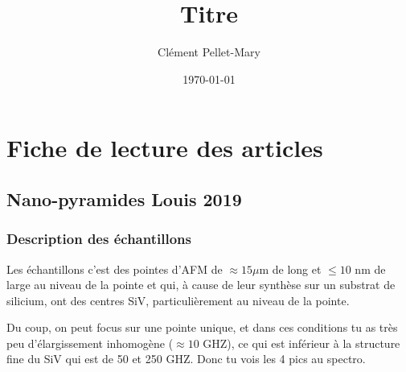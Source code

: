\documentclass[a4paper]{report}
\title{Titre}
\author{Clément Pellet-Mary}
\date\today
\begin{document}
\chapter{Fiche de lecture des articles}
  \section{Nano-pyramides Louis 2019}
  \subsection{Description des échantillons}
  Les échantillons c'est des pointes d'AFM de $\approx 15 \mu$m de long et $\leq 10$ nm de large au niveau de la pointe et qui, à cause de leur synthèse sur un substrat de silicium, ont des centres SiV, particulièrement au niveau de la pointe.
  
  Du coup, on peut focus sur une pointe unique, et dans ces conditions tu as très peu d'élargissement inhomogène ($\approx 10$ GHZ), ce qui est inférieur à la structure fine du SiV qui est de 50 et 250 GHZ. Donc tu vois les 4 pics au spectro.
 
  
\end{document}
